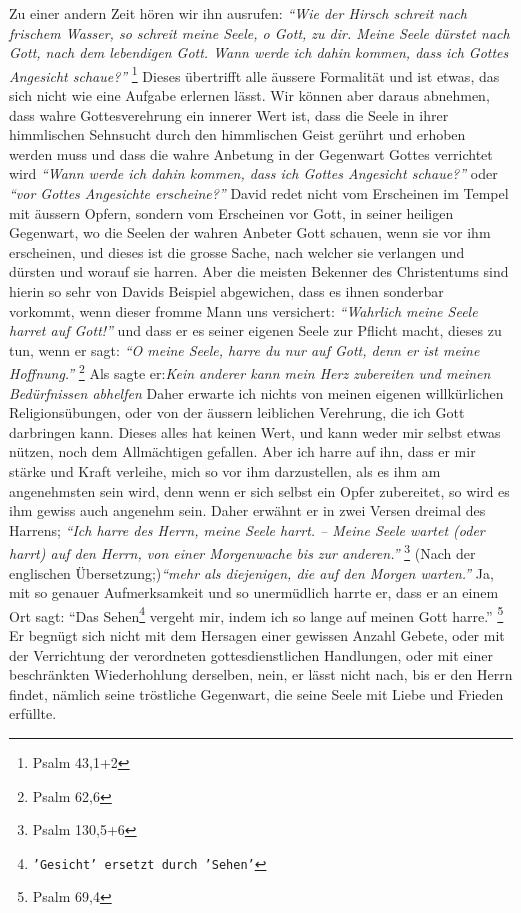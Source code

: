   Zu einer andern Zeit hören wir ihn
ausrufen:
\textit{"`Wie der Hirsch schreit nach
frischem Wasser, so schreit meine Seele, o Gott, zu dir. Meine Seele dürstet
nach Gott, nach dem lebendigen Gott. Wann werde ich dahin kommen, dass ich
Gottes Angesicht schaue?"'}
\footnote{Psalm 43,1+2}
Dieses übertrifft alle äussere
Formalität  und ist etwas, das sich nicht wie eine
Aufgabe erlernen lässt. Wir
können aber daraus abnehmen, dass wahre Gottesverehrung ein innerer Wert ist,
dass die Seele in ihrer himmlischen Sehnsucht durch den himmlischen Geist
gerührt und erhoben werden muss und dass die wahre Anbetung in der Gegenwart
Gottes verrichtet wird
\textit{"`Wann werde ich dahin kommen, dass ich Gottes
Angesicht schaue?"'} oder \textit{"`vor Gottes Angesichte erscheine?"'} David
redet nicht
vom Erscheinen im Tempel  mit äussern Opfern, sondern
vom Erscheinen vor Gott, in
seiner heiligen Gegenwart, wo die Seelen der wahren Anbeter Gott schauen, wenn
sie vor ihm erscheinen, und dieses ist die grosse Sache, nach welcher sie
verlangen und dürsten und worauf sie harren. Aber die meisten Bekenner des
Christentums sind hierin so sehr von Davids Beispiel abgewichen, dass es ihnen
sonderbar vorkommt, wenn dieser fromme Mann uns versichert:
\textit{"`Wahrlich meine Seele harret auf Gott!"'}
und dass er es seiner eigenen Seele zur Pflicht macht,
dieses zu tun, wenn er sagt:
\textit{"`O meine Seele, harre du nur auf Gott, denn er ist meine Hoffnung."'}
\footnote{Psalm 62,6}
Als sagte er:\textit{Kein anderer kann mein Herz
zubereiten und meinen Bedürfnissen abhelfen} Daher erwarte ich nichts von meinen
eigenen willkürlichen Religionsübungen,
oder von der äussern leiblichen
Verehrung, die ich Gott darbringen kann. Dieses alles hat keinen Wert, und kann
weder mir selbst etwas nützen, noch dem Allmächtigen gefallen. Aber ich
harre auf ihn, dass er mir stärke und Kraft verleihe, mich so vor ihm
darzustellen, als es ihm am angenehmsten sein wird, denn wenn er sich selbst ein
Opfer  zubereitet, so wird es ihm gewiss auch angenehm
sein. Daher erwähnt er in
zwei Versen dreimal des Harrens;
\textit{"`Ich harre des Herrn, meine Seele harrt. --
Meine Seele wartet (oder harrt) auf den Herrn, von einer Morgenwache bis zur
anderen."'}
\footnote{Psalm 130,5+6}
(Nach der englischen Übersetzung;)\textit{"`mehr als
diejenigen, die auf den Morgen warten."'} Ja, mit so genauer Aufmerksamkeit und
so unermüdlich harrte er, dass er an einem Ort sagt:
"`Das Sehen\footnote{\texttt{'Gesicht' ersetzt durch 'Sehen'}} vergeht mir,
indem ich so lange auf meinen Gott harre."'
\footnote{Psalm 69,4}
Er begnügt sich
nicht mit dem Hersagen einer gewissen Anzahl Gebete,
oder mit der Verrichtung
der verordneten gottesdienstlichen Handlungen, oder mit einer beschränkten
Wiederhohlung derselben, nein, er lässt nicht nach, bis er den Herrn findet,
nämlich seine tröstliche Gegenwart, die seine Seele mit Liebe und Frieden
erfüllte.

